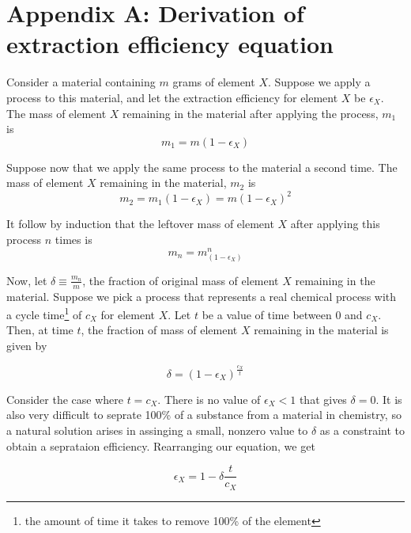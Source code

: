 \appendix
\chapter{Appendix A: Derivation of extraction efficiency equation}
\label{appex:extraction-efficiency}

Consider a material containing $m$ grams of element $X$. Suppose we apply
a process to this material, and let the extraction efficiency for element $X$ be
$\epsilon_{X}$. The mass of element $X$ remaining in the material after applying
the process, $m_{1}$ is
\begin{equation}
   m_{1} = m(1-\epsilon_{X}) 
\end{equation}

Suppose now that we apply the same process to the material a second time. The mass of element $X$ remaining in the material, $m_{2}$ is 
\begin{equation}
    m_{2} = m_{1}(1-\epsilon_{X}) = m(1-\epsilon_{X})^{2}
\end{equation}

It follow by induction that the leftover mass of element $X$ after applying this
process $n$ times is
\begin{equation}
    m_{n} = m_(1-\epsilon_{X})^{n}
\end{equation}

Now, let $\delta \equiv \frac{m_{n}}{m}$, the fraction of original mass of
element $X$ remaining in the material. Suppose we pick a process that represents
a real chemical process with a cycle time\footnote{the amount of time it takes
to remove 100\% of the element} of $c_{X}$ for element $X$. Let $t$ be a value
of time between 0 and $c_{X}$. Then, at time $t$, the fraction of mass
of element $X$ remaining in the material is given by

\begin{equation}
    \delta = (1-\epsilon_{X})^{\frac{c_{X}}{t}}
\end{equation}

Consider the case where $t=c_{X}$. There is no value of $\epsilon_{X} < 1$ that
gives $\delta = 0$. It is also very difficult to seprate 100\% of a substance
from a material in chemistry, so a natural solution arises in assinging a small,
nonzero value to $\delta$ as a constraint to obtain a seprataion efficiency.
Rearranging our equation, we get

\begin{equation}
    \epsilon_{X} = 1 - \delta\frac{t}{c_{X}}
\end{equation}

